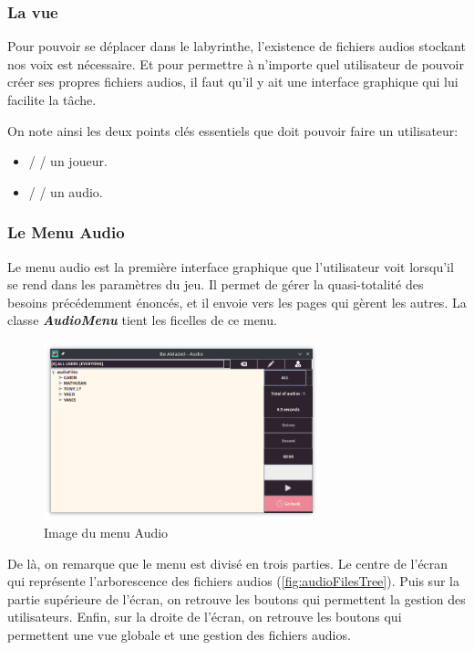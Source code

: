 \subsubsection{La vue}
\label{subsubsec:sonVue}

Pour pouvoir se déplacer dans le labyrinthe, l'existence de fichiers audios
stockant nos voix est nécessaire. Et pour permettre à n'importe quel
utilisateur de pouvoir créer ses propres fichiers audios, il faut qu'il y ait
une interface graphique qui lui facilite la tâche.

On note ainsi les deux points clés essentiels que doit pouvoir faire un
utilisateur:
\begin{itemize}
    \item{     /  /  un joueur.}
    \item{ /   /  un audio.}
\end{itemize}

\subsubsection*{Le Menu Audio}
\label{subsubsec:AudioMenu}

Le menu audio est la première interface graphique que l'utilisateur voit
lorsqu'il se rend dans les paramètres du jeu. Il permet de gérer la
quasi-totalité des besoins précédemment énoncés, et il envoie vers les pages
qui gèrent les autres.
La classe \textbf{\textit{AudioMenu}} tient les ficelles de ce menu.

\begin{figure}[!htb]
    \centering
    \includegraphics[width=8cm]{ressources/Implementation/Son/AudioMenu.png}%
    \caption{Image du menu Audio}%
    \label{fig:AudioMenu}
\end{figure}

De là, on remarque que le menu est divisé en trois parties.
Le centre de l'écran qui représente l'arborescence des fichiers audios
(\ref{fig:audioFilesTree}).
Puis sur la partie supérieure de l'écran, on retrouve les boutons qui
permettent la gestion des utilisateurs.
Enfin, sur la droite de l'écran, on retrouve les boutons qui permettent une vue
globale et une gestion des fichiers audios.

